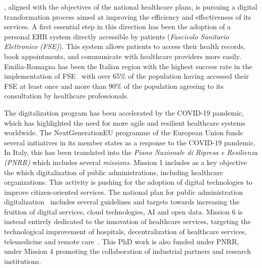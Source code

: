 \ausl{}, aligned with the objectives of the national healthcare plans, is pursuing a digital transformation process aimed at improving the efficiency and effectiveness of its services.
%
A first essential step in this direction has been the adoption of a personal \ac{EHR} system directly accessible by patients (\emph{Fascicolo Sanitario Elettronico (FSE)}).
This system allows patients to access their health records, book appointments, and communicate with healthcare providers more easily. 
%
Emilia-Romagna has been the Italian region with the highest success rate in the implementation of FSE~\cite{fse_ausl_prima} with over 65\% of the population having accessed their FSE at least once and more than 90\% of the population agreeing to its consultation by healthcare professionals.

The digitalization program has been accelerated by the COVID-19 pandemic, which has highlighted the need for more agile and resilient healthcare systems worldwide.
%
The NextGenerationEU programme of the European Union funds several initiatives in its member states as a response to the COVID-19 pandemic. 
%
In Italy, this has been translated into the \emph{Piano Nazionale di Ripresa e Resilienza (PNRR)} which includes several \emph{missions}.
Mission 1 includes as a key objective the which digitalization of public administrations, including healthcare organizations. %
This activity is pushing for the adoption of digital technologies to improve citizen-oriented services.
%
The national plan for public administration digitalization~\cite{AgID_PianoTriennale_2025} includes several guidelines and targets towards increasing the fruition of digital services, cloud technologies, \ac{AI} and open data.
Mission 6 is instead entirely dedicated to the innovation of healthcare services, targeting the technological improvement of hospitals, decentralization of healthcare services, telemedicine and remote care~\cite{italy_pnrr_2021}.
%
This PhD work is also funded under PNRR, under Mission 4 promoting the collaboration of industrial partners and research institutions.

\addtocounter{footnote}{1}

